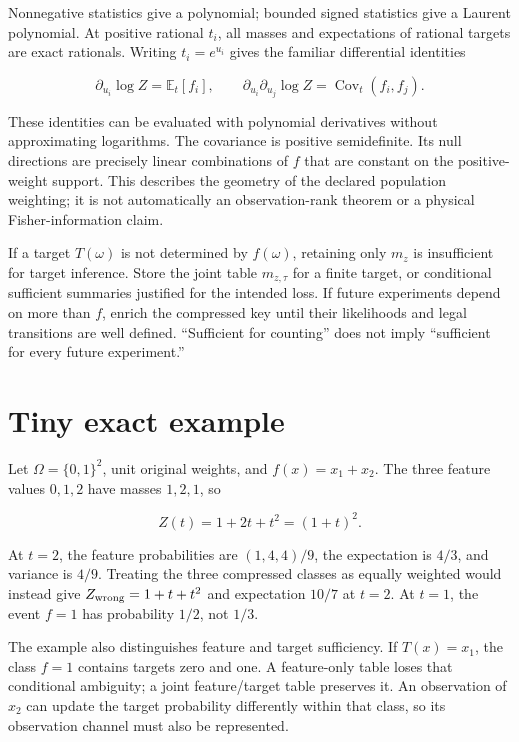 \documentclass[
  11pt,
  a4paper,
]{report}
\begin{document}
Nonnegative statistics give a polynomial; bounded signed statistics give
a Laurent polynomial. At positive rational \(t_i\), all masses and
expectations of rational targets are exact rationals. Writing
\(t_i=e^{u_i}\) gives the familiar differential identities

\[
\partial_{u_i}\log Z=\mathbb E_t[f_i],\qquad
\partial_{u_i}\partial_{u_j}\log Z=\operatorname{Cov}_t(f_i,f_j).
\]

These identities can be evaluated with polynomial derivatives without
approximating logarithms. The covariance is positive semidefinite. Its
null directions are precisely linear combinations of \(f\) that are
constant on the positive-weight support. This describes the geometry of
the declared population weighting; it is not automatically an
observation-rank theorem or a physical Fisher-information claim.

If a target \(T(\omega)\) is not determined by \(f(\omega)\), retaining
only \(m_z\) is insufficient for target inference. Store the joint table
\(m_{z,\tau}\) for a finite target, or conditional sufficient summaries
justified for the intended loss. If future experiments depend on more
than \(f\), enrich the compressed key until their likelihoods and legal
transitions are well defined. ``Sufficient for counting'' does not imply
``sufficient for every future experiment.''

\hypertarget{tiny-exact-example-3}{%
\section{Tiny exact example}\label{tiny-exact-example-3}}

Let \(\Omega=\{0,1\}^2\), unit original weights, and \(f(x)=x_1+x_2\).
The three feature values \(0,1,2\) have masses \(1,2,1\), so

\[
Z(t)=1+2t+t^2=(1+t)^2.
\]

At \(t=2\), the feature probabilities are \((1,4,4)/9\), the expectation
is \(4/3\), and variance is \(4/9\). Treating the three compressed
classes as equally weighted would instead give \(Z_{\rm wrong}=1+t+t^2\)
and expectation \(10/7\) at \(t=2\). At \(t=1\), the event \(f=1\) has
probability \(1/2\), not \(1/3\).

The example also distinguishes feature and target sufficiency. If
\(T(x)=x_1\), the class \(f=1\) contains targets zero and one. A
feature-only table loses that conditional ambiguity; a joint
feature/target table preserves it. An observation of \(x_2\) can update
the target probability differently within that class, so its observation
channel must also be represented.
\end{document}
